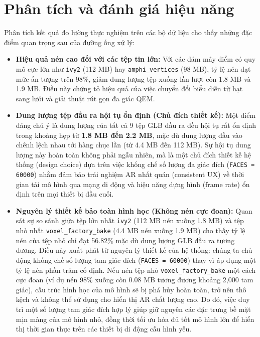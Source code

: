 \documentclass[a4paper,12pt]{report}
\begin{document}
\section{Phân tích và đánh giá hiệu năng}
Phân tích kết quả đo lường thực nghiệm trên các bộ dữ liệu cho thấy những đặc điểm quan trọng sau của đường ống xử lý:
\begin{itemize}
    \item \textbf{Hiệu quả nén cao đối với các tệp tin lớn:} Với các đám mây điểm có quy mô cực lớn như \texttt{ivy2} (112 MB) hay \texttt{amphi\_vertices} (98 MB), tỷ lệ nén đạt mức ấn tượng trên 98\%, giảm dung lượng tệp xuống lần lượt còn 1.8 MB và 1.9 MB. Điều này chứng tỏ hiệu quả của việc chuyển đổi biểu diễn từ hạt sang lưới và giải thuật rút gọn đa giác QEM.
    \item \textbf{Dung lượng tệp đầu ra hội tụ ổn định (Chủ đích thiết kế):} Một điểm đáng chú ý là dung lượng của tất cả 9 tệp GLB đầu ra đều hội tụ rất ổn định trong khoảng hẹp từ \textbf{1.8 MB đến 2.2 MB}, mặc dù dung lượng đầu vào chênh lệch nhau tới hàng chục lần (từ 4.4 MB đến 112 MB). Sự hội tụ dung lượng này hoàn toàn không phải ngẫu nhiên, mà là một chủ đích thiết kế hệ thống (design choice) dựa trên việc khống chế số lượng đa giác đích (\texttt{FACES = 60000}) nhằm đảm bảo trải nghiệm AR nhất quán (consistent UX) về thời gian tải mô hình qua mạng di động và hiệu năng dựng hình (frame rate) ổn định trên mọi thiết bị đầu cuối. 
    \item \textbf{Nguyên lý thiết kế bảo toàn hình học (Không nén cực đoan):} 
    Quan sát sự so sánh giữa tệp lớn nhất \texttt{ivy2} (112 MB nén xuống 1.8 MB) và tệp nhỏ nhất \texttt{voxel\_factory\_bake} (4.4 MB nén xuống 1.9 MB) cho thấy tỷ lệ nén của tệp nhỏ chỉ đạt 56.82\% mặc dù dung lượng GLB đầu ra tương đương. 
    Điều này xuất phát từ nguyên lý thiết kế của hệ thống: chúng ta chủ động khống chế số lượng tam giác đích (\texttt{FACES = 60000}) thay vì áp dụng một tỷ lệ nén phần trăm cố định. 
    Nếu nén tệp nhỏ \texttt{voxel\_factory\_bake} một cách cực đoan (ví dụ nén 98\% xuống còn 0.08 MB tương đương khoảng 2{,}000 tam giác), cấu trúc hình học của mô hình sẽ bị phá hủy hoàn toàn, trở nên thô kệch và không thể sử dụng cho hiển thị AR chất lượng cao. Do đó, việc duy trì một số lượng tam giác đích hợp lý giúp giữ nguyên các đặc trưng bề mặt mịn màng của mô hình nhỏ, đồng thời tối ưu hóa đủ tốt mô hình lớn để hiển thị thời gian thực trên các thiết bị di động cấu hình yếu.
\end{itemize}
\end{document}
